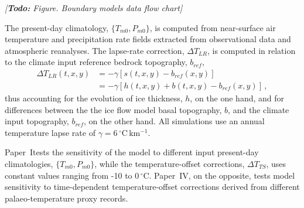 \documentclass{article}
\newcommand{\todo}[1]{\emph{[\textbf{Todo:} #1]}}
\newcommand{\unit}[1]{\ensuremath{\mathrm{#1}}}
\newcommand{\degree}[0]{\ensuremath{^{\circ}}}
\newcommand{\degC}[0]{\unit{{\degree}C}}
\newcommand{\CCLI}[0]{Paper~I}      %
\newcommand{\CCYC}[0]{Paper~IV}     %
\begin{document}
\todo{Figure. Boundary models data flow chart}

The present-day climatology, $\{T_{m0}, P_{m0}\}$, is computed from
near-surface air temperature and precipitation rate fields extracted from
observational data and atmospheric reanalyses.
The lapse-rate correction, ${\Delta}T_{LR}$, is computed in relation to the
climate input reference bedrock topography, $b_{ref}$,
\begin{align}
    {\Delta}T_{LR}(t, x, y) &= -\gamma [s(t, x, y)-b_{ref}(x, y)] \\
                            &= -\gamma [h(t, x, y)+b(t, x, y)-b_{ref}(x, y)]\,,
\end{align}
thus accounting for the evolution of ice thickness, $h$, on the one hand, and
for differences between the the ice flow model basal topography, $b$, and the
climate input topography, $b_{ref}$, on the other hand. All simulations use an
annual temperature lapse rate of $\gamma = 6\,\unit{\degC\,km^{-1}}$.

\CCLI tests the sensitivity of the model to different input present-day
climatologies, $\{T_{m0}, P_{m0}\}$, while the temperature-offset corrections,
${\Delta}T_{TS}$, uses constant values ranging from -10 to 0\,\degC. \CCYC,
on the opposite, tests model sensitivity to time-dependent temperature-offset
corrections derived from different palaeo-temperature proxy records.
\end{document}
